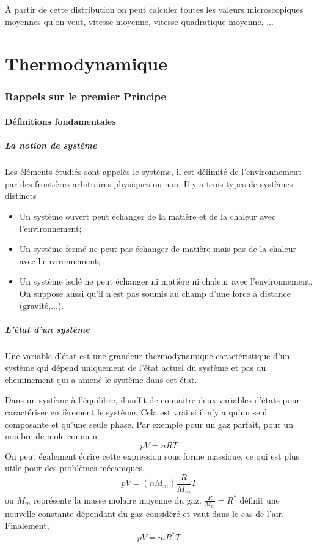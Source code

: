 À partir de cette distribution on peut calculer
toutes les valeurs microscopiques moyennes qu'on veut,
vitesse moyenne, vitesse quadratique moyenne, ...

\part{Thermodynamique}
\section{Rappels sur le premier Principe}
\subsection{Définitions fondamentales}
\subsubsection{La notion de système}
Les éléments étudiés sont appelés le système,
il est délimité de l'environnement par des
frontières arbitraires physiques ou non.
Il y a trois types de systèmes distincts
\begin{itemize}
  \item Un système ouvert peut échanger de la matière et
    de la chaleur avec l'environnement;
  \item Un système fermé ne peut pas échanger de matière mais
    pas de la chaleur avec l'environnement;
  \item Un système isolé ne peut échanger ni matière
    ni chaleur avec l'environnement.
    On suppose aussi qu'il n'est pas soumis au champ
    d'une force à distance (gravité,...).
\end{itemize}

\subsubsection{L'état d'un système}
Une variable d'état est une grandeur thermodynamique caractéristique
d'un système qui dépend uniquement de l'état actuel du système et
pas du cheminement qui a amené le système dans cet état.

Dans un système à l'équilibre, il suffit de connaitre deux variables d'états
pour caractériser entièrement le système.
Cela est vrai si il n'y a qu'un seul composante et qu'une seule phase.
Par exemple pour un gaz parfait, pour un nombre de mole connu n
\[ pV = nRT \]
On peut également écrire cette expression sous forme massique,
ce qui est plus utile pour des problèmes mécaniques.
\[ pV = (nM_m) \frac R {M_m} T \]
ou $M_m$ représente la masse molaire moyenne du gaz.
$\frac{R}{M_m} = R^*$ définit une nouvelle constante dépendant du gaz considéré
et vaut  dans le cas de l'air.
Finalement,
\[ pV = mR^*T \]

